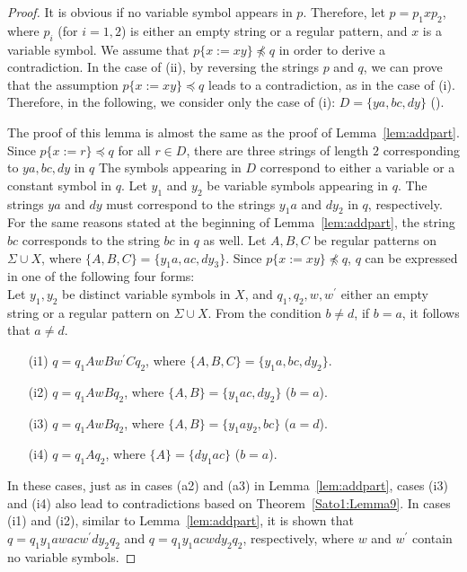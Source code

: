 \begin{proof}
It is obvious if no variable symbol appears in $p$.
Therefore, let $p=p_{1}xp_{2}$, where $p_{i}$ (for $i=1,2$) is either an empty string or a regular pattern, and $x$ is a variable symbol.
We assume that $p \{ x := xy \} \not \preceq q$ in order to derive a contradiction.
In the case of \textrm{(ii)}, by reversing the strings $p$ and $q$, we can prove that the assumption $p \{ x := xy \} \preceq q$ leads to a contradiction, as in the case of \textrm{(i)}.
Therefore, in the following, we consider only the case of \textrm{(i)}: $D=\{ ya, bc, dy \}$ (\TheConditionB).

The proof of this lemma is almost the same as the proof of Lemma~\ref{lem:addpart}.
Since $p \{ x := r \} \preceq q$ for all $r \in D$, there are three strings of length $2$ corresponding to $ya, bc, dy$ in $q$
The symbols appearing in $D$ correspond to either a variable or a constant symbol in $q$.
Let $y_{1}$ and $y_{2}$ be variable symbols appearing in $q$.
The strings $ya$ and $dy$ must correspond to the strings $y_{1}a$ and $dy_{2}$ in $q$, respectively.
For the same reasons stated at the beginning of Lemma~\ref{lem:addpart}, the string $bc$ corresponds to the string $bc$ in $q$ as well.
Let $A,B,C$ be regular patterns on $\Sigma \cup X$, where $\{ A,B,C \} = \{ y_{1}a,ac,dy_{3} \}$.
Since $p \{ x := xy \} \not \preceq q$, $q$ can be expressed in one of the following four forms:\\
Let $y_{1}, y_{2}$ be distinct variable symbols in $X$, and $q_{1}, q_{2}, w, w^{\prime}$ either an empty string or a regular pattern on $\Sigma\cup X$.
From the condition $b \not= d$, if $b = a$, it follows that $a \not= d$.
\begin{enumerate}
\item[(i1)] $q=q_{1}AwBw^{\prime}Cq_{2}$, where $\{ A,B,C \} = \{ y_{1}a,bc,dy_{2} \}$.
\item[(i2)] $q=q_{1}AwBq_{2}$, where $\{ A,B \} = \{ y_{1}ac,dy_{2} \}$ ($b = a$).
\item[(i3)] $q=q_{1}AwBq_{2}$, where $\{ A,B \} = \{ y_{1}ay_{2},bc \}$ ($a = d$).
\item[(i4)] $q=q_{1}Aq_{2}$, where $\{A\} = \{dy_{1}ac\}$ ($b = a$).
\end{enumerate}

In these cases, just as in cases (a2) and (a3) in Lemma~\ref{lem:addpart}, cases (i3) and (i4) also lead to contradictions based on Theorem~\ref{Sato1:Lemma9}.
In cases (i1) and (i2), similar to Lemma~\ref{lem:addpart}, it is shown that $q=q_{1}y_{1}awacw^{\prime}dy_{2}q_{2}$ and $q=q_{1}y_{1}acwdy_{2}q_{2}$, respectively, where $w$ and $w^{\prime}$ contain no variable symbols.


\end{proof}
